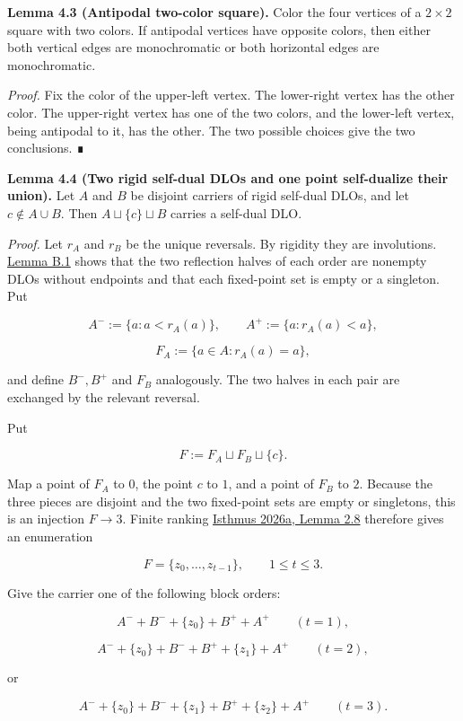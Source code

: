 \documentclass[
  english,
  11pt,
  reqno]{amsart}
\newcounter{none} %
\begin{document}
\textbf{Lemma 4.3 (Antipodal two-color square).} Color the four vertices
of a \(2\times2\) square with two colors. If antipodal vertices have
opposite colors, then either both vertical edges are monochromatic or
both horizontal edges are monochromatic.

\emph{Proof.} Fix the color of the upper-left vertex. The lower-right
vertex has the other color. The upper-right vertex has one of the two
colors, and the lower-left vertex, being antipodal to it, has the other.
The two possible choices give the two conclusions. ∎

\protect{}\label{lem:4-4-selfdual-amalgamation}

\textbf{Lemma 4.4 (Two rigid self-dual DLOs and one point self-dualize
their union).} Let \(A\) and \(B\) be disjoint carriers of rigid
self-dual DLOs, and let \(c\notin A\cup B\). Then
\(A\sqcup\{c\}\sqcup B\) carries a self-dual DLO.

\emph{Proof.} Let \(r_A\) and \(r_B\) be the unique reversals. By
rigidity they are involutions. \hyperref[lem:b-1-reflection-split]{Lemma
B.1} shows that the two reflection halves of each order are nonempty
DLOs without endpoints and that each fixed-point set is empty or a
singleton. Put

\[
A^-:=\{a:a<r_A(a)\},
\qquad
A^+:=\{a:r_A(a)<a\},
\]

\[
F_A:=\{a\in A:r_A(a)=a\},
\]

and define \(B^-,B^+\) and \(F_B\) analogously. The two halves in each
pair are exchanged by the relevant reversal.

Put

\[
F:=F_A\sqcup F_B\sqcup\{c\}.
\]

Map a point of \(F_A\) to \(0\), the point \(c\) to \(1\), and a point
of \(F_B\) to \(2\). Because the three pieces are disjoint and the two
fixed-point sets are empty or singletons, this is an injection
\(F\to3\). Finite ranking \hyperref[ref:isthmus2026a]{Isthmus 2026a,
Lemma 2.8} therefore gives an enumeration

\[
F=\{z_0,\ldots,z_{t-1}\},
\qquad
1\le t\le3.
\]

Give the carrier one of the following block orders:

\[
A^-+B^-+\{z_0\}+B^++A^+
\qquad(t=1),
\]

\[
A^-+\{z_0\}+B^-+B^++\{z_1\}+A^+
\qquad(t=2),
\]

or

\[
A^-+\{z_0\}+B^-+\{z_1\}+B^++\{z_2\}+A^+
\qquad(t=3).
\]
\end{document}

